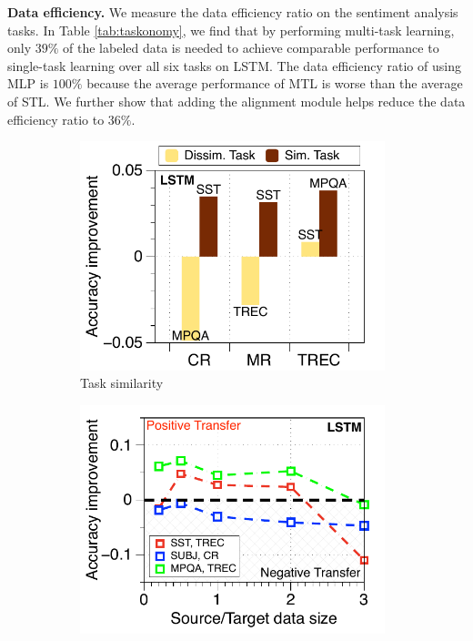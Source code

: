 \textbf{Data efficiency.}
We measure the data efficiency ratio on the sentiment analysis tasks.
In Table \ref{tab:taskonomy}, we find that by performing multi-task learning, only $39\%$ of the labeled data is needed to achieve comparable performance to single-task learning over all six tasks on LSTM.
The data efficiency ratio of using MLP is $100\%$ because the average performance of MTL is worse than the average of STL.
We further show that adding the alignment module helps reduce the data efficiency ratio to $36\%$.


\begin{figure}[!t]
	\centering
	\begin{subfigure}[b]{0.33\textwidth}
		\centering
		\includegraphics[width=0.975\textwidth]{figures/task_sim_norm_lstm.pdf}
		\caption{Task similarity}
		\label{fig_ab_sim}
	\end{subfigure}%
	\begin{subfigure}[b]{0.33\textwidth}
		\centering
		\includegraphics[width=0.975\textwidth]{figures/ratio_norm_3_pairs_lstm.pdf}

\end{subfigure}
\end{figure}
